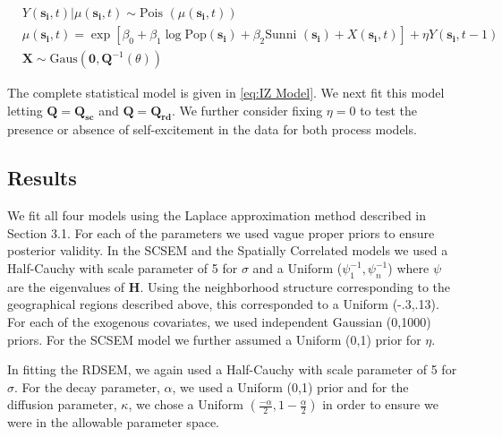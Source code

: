 \documentclass[11pt]{isuthesis}
\begin{document}
\begin{align}
& Y(\boldsymbol{s_i},t)|\mu(\boldsymbol{s_i},t) \sim \text{Pois }(\mu(\boldsymbol{s_i},t)) \label{eq:IZ Model}\\
& \mu(\boldsymbol{s_i},t) = \exp[\beta_0+\beta_1\log \text{Pop}(\boldsymbol{s_i})+\beta_2\text{Sunni }(\boldsymbol{s_i})+X(\boldsymbol{s_i},t)] + \eta Y(\boldsymbol{s_i},t-1) \nonumber \\
& \boldsymbol{X}\sim \mbox{Gaus}(\boldsymbol{0},\boldsymbol{Q}^{-1}(\theta))  \nonumber
\end{align}

The complete statistical model is given in \eqref{eq:IZ Model}.  We next fit this model letting $\boldsymbol{Q}=\boldsymbol{Q_{sc}}$ and $\boldsymbol{Q}=\boldsymbol{Q_{rd}}$.  We further consider fixing $\eta=0$ to test the presence or absence of self-excitement in the data for both process models.


\subsection{Results}



We fit all four models using the Laplace approximation method described in Section 3.1.  For each of the parameters we used vague proper priors to ensure posterior validity.  In the SCSEM and the Spatially Correlated models we used a Half-Cauchy with scale parameter of 5 for $\sigma$ and a Uniform ($\psi_{1}^{-1},\psi_{n}^{-1}$) where $\psi$ are the eigenvalues of $\boldsymbol{H}$.  Using the neighborhood structure corresponding to the geographical regions described above, this corresponded to a Uniform (-.3,.13). For each of the exogenous covariates, we used independent Gaussian (0,1000) priors.  For the SCSEM model we further assumed a Uniform (0,1) prior for $\eta$.

In fitting the RDSEM, we again used a Half-Cauchy with scale parameter of 5 for $\sigma$.  For the decay parameter, $\alpha$, we used a Uniform (0,1) prior and for the diffusion parameter, $\kappa$, we chose a Uniform $\left(\frac{-\alpha}{2},1-\frac{\alpha}{2}\right)$ in order to ensure we were in the allowable parameter space.
\end{document}
